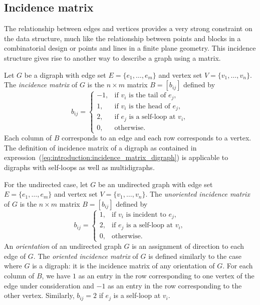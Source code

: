 
\subsection{Incidence matrix}

The relationship between edges and vertices provides a very strong
constraint on the data structure, much like the relationship between
points and blocks in a combinatorial design or points and lines in a
finite plane geometry. This incidence structure gives rise to another
way to describe a graph using a matrix.

Let $G$ be a digraph with edge set $E = \{ e_1, \dots, e_m \}$ and
vertex set $V = \{ v_1, \dots, v_n \}$. The \emph{incidence matrix} of
$G$ is the $n \times m$ matrix $B = [b_{ij}]$ defined by
%
\begin{equation}
\label{eq:introduction:incidence_matrix_digraph}
b_{ij}
=
\begin{cases}
-1, & \text{if $v_i$ is the tail of $e_j$}, \\
1,  & \text{if $v_i$ is the head of $e_j$}, \\
2,  & \text{if $e_j$ is a self-loop at $v_i$}, \\
0,  & \text{otherwise}.
\end{cases}
\end{equation}
%
Each column of $B$ corresponds to an edge and each row corresponds to
a vertex. The definition of incidence matrix of a digraph as contained
in expression~(\ref{eq:introduction:incidence_matrix_digraph}) is
applicable to digraphs with self-loops as well as multidigraphs.

For the undirected case, let $G$ be an undirected graph with edge set
$E = \{ e_1, \dots, e_m \}$ and vertex set
$V = \{ v_1, \dots, v_n \}$. The \emph{unoriented incidence matrix} of
$G$ is the $n \times m$ matrix $B = [b_{ij}]$ defined by
\[
b_{ij}
=
\begin{cases}
1, & \text{if $v_i$ is incident to $e_j$}, \\
2, & \text{if $e_j$ is a self-loop at $v_i$}, \\
0, & \text{otherwise}.
\end{cases}
\]
An \emph{orientation} of an undirected graph $G$ is an assignment of
direction to each edge of $G$. The \emph{oriented incidence matrix} of
$G$ is defined similarly to the case where $G$ is a digraph: it is the
incidence matrix of any orientation of $G$. For each column of $B$, we
have $1$ as an entry in the row corresponding to one vertex of the
edge under consideration and $-1$ as an entry in the row corresponding
to the other vertex. Similarly, $b_{ij} = 2$ if $e_j$ is a self-loop
at $v_i$.

